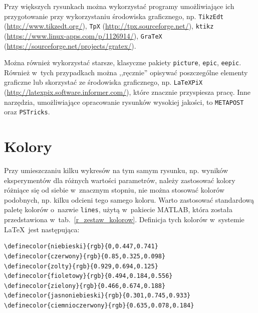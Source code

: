 Przy większych rysunkach można wykorzystać programy umożliwiające ich przygotowanie przy wykorzystaniu środowiska graficznego, np. \verb+TikzEdt+ (\url{http://www.tikzedt.org/}), \verb+TpX+ (\url{http://tpx.sourceforge.net/}), \verb+ktikz+ (\url{https://www.linux-apps.com/p/1126914/}), \verb+GraTeX+ (\url{https://sourceforge.net/projects/gratex/}).

Można również wykorzystać starsze, klasyczne pakiety \verb+picture+, \verb+epic+, \verb+eepic+. Również w~tych przypadkach można ,,ręcznie'' opisywać poszczególne elementy graficzne lub skorzystać ze środowiska graficznego, np. \verb+LaTeXPiX+ (\url{http://latexpix.software.informer.com/}), które znacznie przyspiesza pracę. Inne narzędzia, umożliwiające opracowanie rysunków wysokiej jakości, to \verb+METAPOST+ oraz \verb+PSTricks+.

\section{Kolory}
Przy umieszczaniu kilku wykresów na tym samym rysunku, np. wyników eksperymentów dla różnych wartości parametrów, należy zastosować kolory różniące się od siebie w~znacznym stopniu, nie można stosować kolorów podobnych, np. kilku odcieni tego samego koloru. Warto zastosować standardową paletę kolorów o~nazwie \texttt{lines}, użytą w~pakiecie MATLAB, która została przedstawiona w~tab.~\ref{r_zestaw_kolorow}. Definicja tych kolorów w~systemie \LaTeX\ jest następująca:
\begin{lstlisting}[style=customlatex,frame=single]
\definecolor{niebieski}{rgb}{0,0.447,0.741}
\definecolor{czerwony}{rgb}{0.85,0.325,0.098}	
\definecolor{zolty}{rgb}{0.929,0.694,0.125}		
\definecolor{fioletowy}{rgb}{0.494,0.184,0.556}	
\definecolor{zielony}{rgb}{0.466,0.674,0.188}
\definecolor{jasnoniebieski}{rgb}{0.301,0.745,0.933}
\definecolor{ciemnioczerwony}{rgb}{0.635,0.078,0.184}
\end{lstlisting}


